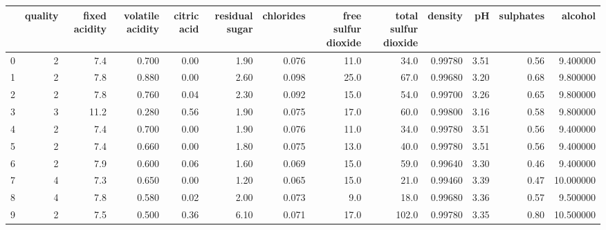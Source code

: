 \begin{tabular}{lrrrrrrrrrrrr}
\toprule
{} &  quality &  fixed acidity &  volatile acidity &  citric acid &  residual sugar &  chlorides &  free sulfur dioxide &  total sulfur dioxide &  density &    pH &  sulphates &    alcohol \\
\midrule
0    &        2 &            7.4 &             0.700 &         0.00 &            1.90 &      0.076 &                 11.0 &                  34.0 &  0.99780 &  3.51 &       0.56 &   9.400000 \\
1    &        2 &            7.8 &             0.880 &         0.00 &            2.60 &      0.098 &                 25.0 &                  67.0 &  0.99680 &  3.20 &       0.68 &   9.800000 \\
2    &        2 &            7.8 &             0.760 &         0.04 &            2.30 &      0.092 &                 15.0 &                  54.0 &  0.99700 &  3.26 &       0.65 &   9.800000 \\
3    &        3 &           11.2 &             0.280 &         0.56 &            1.90 &      0.075 &                 17.0 &                  60.0 &  0.99800 &  3.16 &       0.58 &   9.800000 \\
4    &        2 &            7.4 &             0.700 &         0.00 &            1.90 &      0.076 &                 11.0 &                  34.0 &  0.99780 &  3.51 &       0.56 &   9.400000 \\
5    &        2 &            7.4 &             0.660 &         0.00 &            1.80 &      0.075 &                 13.0 &                  40.0 &  0.99780 &  3.51 &       0.56 &   9.400000 \\
6    &        2 &            7.9 &             0.600 &         0.06 &            1.60 &      0.069 &                 15.0 &                  59.0 &  0.99640 &  3.30 &       0.46 &   9.400000 \\
7    &        4 &            7.3 &             0.650 &         0.00 &            1.20 &      0.065 &                 15.0 &                  21.0 &  0.99460 &  3.39 &       0.47 &  10.000000 \\
8    &        4 &            7.8 &             0.580 &         0.02 &            2.00 &      0.073 &                  9.0 &                  18.0 &  0.99680 &  3.36 &       0.57 &   9.500000 \\
9    &        2 &            7.5 &             0.500 &         0.36 &            6.10 &      0.071 &                 17.0 &                 102.0 &  0.99780 &  3.35 &       0.80 &  10.500000 \\

\end{tabular}
